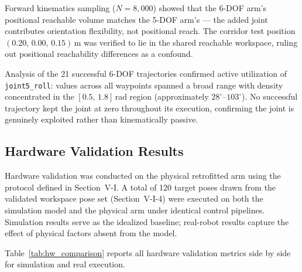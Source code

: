 \documentclass[conference]{IEEEtran}
\begin{document}
	Forward kinematics sampling ($N = 8{,}000$) showed that the
	6-DOF arm's positional reachable volume matches the 5-DOF
	arm's — the added joint contributes orientation flexibility,
	not positional reach. The corridor test position
	$(0.20,\,0.00,\,0.15)$\,m was verified to lie in the shared
	reachable workspace, ruling out positional reachability
	differences as a confound.
	
	Analysis of the 21 successful 6-DOF trajectories confirmed
	active utilization of \texttt{joint5\_roll}: values across all
	waypoints spanned a broad range with density concentrated in
	the $[0.5,\,1.8]$\,rad region (approximately
	$28^\circ$--$103^\circ$). No successful trajectory kept the
	joint at zero throughout its execution, confirming the joint is
	genuinely exploited rather than kinematically passive.
	
	\subsection{Hardware Validation Results}
	\label{sec:hw_results}
	
	Hardware validation was conducted on the physical retrofitted
	arm using the protocol defined in Section~V-I. A total of
	120 target poses drawn from the validated workspace pose set
	(Section~V-I-4) were executed on both the simulation model and
	the physical arm under identical control pipelines. Simulation
	results serve as the idealized baseline; real-robot results
	capture the effect of physical factors absent from the model.
	
	Table~\ref{tab:hw_comparison} reports all hardware validation
	metrics side by side for simulation and real execution.
	
\end{document}
